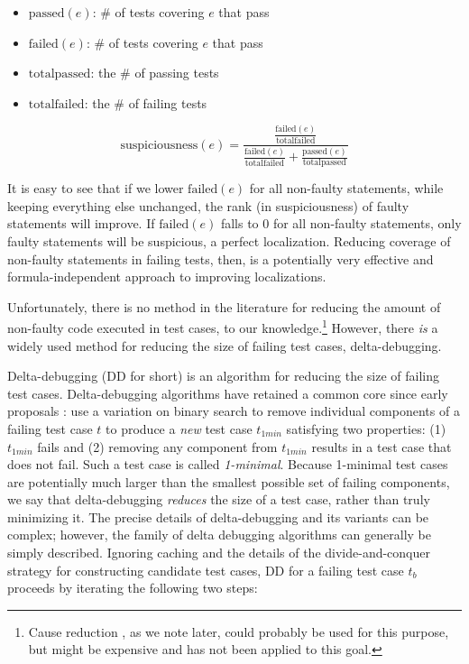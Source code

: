 \begin{itemize}
\item $\text{passed}(e)$:  \# of tests covering $e$ that pass
\item $\text{failed}(e)$:  \# of tests covering $e$ that pass
\item $\text{totalpassed}$:  the \# of passing tests
\item $\text{totalfailed}$:  the \# of failing tests
\end{itemize}

$$ \text{suspiciousness}(e) =  \frac{\frac{\text{failed}(e)}{\text{totalfailed}}}{\frac{\text{failed}(e)}{\text{totalfailed}} + \frac{\text{passed}(e)}{\text{totalpassed}}}$$


It is easy to see that if we lower $\text{failed}(e)$ for all
non-faulty statements, while keeping everything else unchanged, the
rank (in suspiciousness) of faulty statements will improve.  If
$\text{failed}(e)$ falls to 0 for all non-faulty statements, only
faulty statements will be suspicious, a perfect localization.  Reducing coverage of non-faulty
statements in failing tests, then, is a potentially very effective  and
formula-independent approach to improving localizations.

Unfortunately, there is no method in the literature for reducing the
amount of non-faulty code executed in test cases, to our
knowledge.\footnote{Cause reduction \cite{icst2014}, as we note later,
could probably be used for this purpose, but might be expensive and
has not been applied to this goal.}  However, there \emph{is} a widely
used method for reducing the size of failing test cases, delta-debugging.

Delta-debugging \cite{DD} (DD for short) is an algorithm for reducing
the size of failing test cases.  Delta-debugging algorithms have
retained a common core since early proposals \cite{DDISSTA}: use a
variation on binary search to remove individual components of a
failing test case $t$ to produce a \emph{new} test case $t_{1min}$
satisfying two properties: (1) $t_{1min}$ fails and (2) removing any
component from $t_{1min}$ results in a test case that does not fail.
Such a test case is called \emph{1-minimal}.  Because 1-minimal test
cases are potentially much larger than the smallest possible set of
failing components, we say that delta-debugging \emph{reduces} the
size of a test case, rather than truly minimizing it.  The precise
details of delta-debugging and its variants can be complex; however,
the family of delta debugging algorithms can generally be simply
described.  Ignoring caching and the details of the divide-and-conquer
strategy for constructing candidate test cases, DD for a
failing test case $t_b$ proceeds by iterating the following two
steps:

